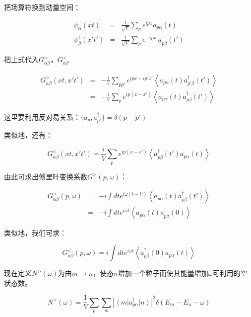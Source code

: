 把场算符换到动量空间：

\begin{eqnarray}
\psi_{\alpha} (xt) &=& \frac{1}{\sqrt{V}} \sum\limits_p e^{i px} a_{p \alpha} (t) \\
\psi^{\dagger}_{\beta} (x't') &=& \frac{1}{\sqrt{V}} \sum\limits_p e^{ - i px' } a^{\dagger}_{p \beta} (t')
\end{eqnarray}

把上式代入$G_{\alpha \beta}^{>}$，$G_{\alpha \beta}^{<}$


\begin{eqnarray*}
G_{\alpha \beta}^{>} (xt,x't') &= & -\frac{i}{V} \sum\limits_{pp'} e^{ipx -ip'x'} \left\langle a_{p \alpha}(t)  a^{\dagger}_{p' \beta} (t') \right\rangle   \\
{}&=& -\frac{i}{V} \sum\limits_p e^{ip(x-x')} \left\langle a_{p \alpha}(t)  a^{\dagger}_{p \beta} (t') \right\rangle
\end{eqnarray*}

这里要利用反对易关系：$\{ a_p , a^{\dagger}_{p'}  \} = \delta (p - p') $

类似地，还有：

\begin{equation*}
G_{\alpha \beta}^{<} (xt,x't') = \frac{i }{V } \sum\limits_p e^{i p (x-x')} \left\langle a^{\dagger}_{p \beta} (t') a_{p \alpha} (t)   \right\rangle
\end{equation*}

由此可求出傅里叶变换系数$G^{>}(p,\omega)$：

\begin{eqnarray*}
G^{>}_{\alpha \beta} (p,\omega) &=& -i \int dt e^{i \omega ( t - t' )} \left\langle  a_{p \alpha}(t) a^{\dagger}_{p \beta} (t')   \right\rangle \\
{} & = & -i \int dt e^{i \omega t } \left\langle  a_{p \alpha}(t) a^{\dagger}_{p \beta} (0)   \right\rangle
\end{eqnarray*}

类似地，我们可求：

\begin{equation*}
G^{<}_{\alpha \beta} (p,\omega) = i \int dt e^{i \omega t} \left\langle a^{\dagger}_{p \beta} (0)  a_{p \alpha} (t)  \right\rangle
\end{equation*}

现在定义$N^{>} (\omega) $为由$m \to n$，使态$n$增加一个粒子而使其能量增加$\omega $可利用的空状态数。

\begin{equation}
N^{>} (\omega) = \frac{1}{V} \sum\limits_p \sum\limits_m \left| \left\langle m \right| a^{\dagger}_{p \alpha}  \left|  n  \right\rangle  \right|^2 \delta(E_m - E_n - \omega)
\end{equation}

